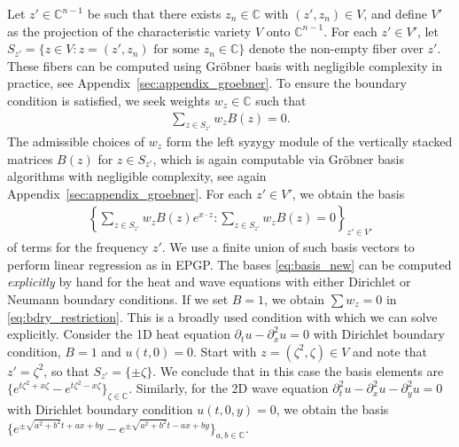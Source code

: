 \documentclass{article} %
\theoremstyle{plain}
\theoremstyle{definition}
\theoremstyle{remark}
\newenvironment{example}
  {\pushQED{\qed}\renewcommand{\qedsymbol}{$\triangle$}\examplex}
  {\popQED\endexamplex}
\newcommand{\CC}{\mathbb{C}}
\begin{document}
Let $z' \in \CC^{n-1}$ be such that there exists $z_n \in \CC$ with $(z', z_n) \in V$, and define $V'$ as the projection of the characteristic variety $V$ onto $\CC^{n-1}$. For each $z' \in V'$, let $S_{z'} = \{z \in V \colon z = (z', z_n) \text{ for some } z_n \in \CC\}$ denote the non-empty fiber over $z'$. These fibers can be computed using Gröbner basis with negligible complexity in practice, see Appendix~\ref{sec:appendix_groebner}. To ensure the boundary condition is satisfied, we seek weights $w_z \in \CC$ such that
\begin{align}\label{eq:bdry_restriction}
\sum\nolimits_{z \in S_{z'}} w_z B(z) = 0.
\end{align}
The admissible choices of $w_z$ form the left syzygy module of the vertically stacked matrices $B(z)$ for $z \in S_{z'}$, which is again computable via Gröbner basis algorithms with negligible complexity, see again Appendix~\ref{sec:appendix_groebner}.
For each $z'\in V'$, we obtain the basis
\begin{align}\label{eq:basis_new}
\left\{\sum\nolimits_{z\in S_{z'}}w_zB(z)e^{x\cdot z}\colon \sum\nolimits_{z\in S_{z'}}w_z B(z)=0\right\}_{z'\in V'}
\end{align}
of terms for the frequency $z'$.
We use a finite union of such basis vectors to perform linear regression as in EPGP.
The bases \eqref{eq:basis_new} can be computed \emph{explicitly} by hand for the heat and wave equations with either Dirichlet or Neumann boundary conditions. 
\begin{example}[Dirichlet boundary condition]
    If we set $B=1$, we  obtain $\sum w_z=0$ in \eqref{eq:bdry_restriction}. This is a broadly used condition with which we can solve explicitly.
\end{example}
\begin{example}\label{exa:1-D_heat}
    Consider the 1D heat equation $\partial_tu-\partial_x^2u=0$ with Dirichlet boundary condition, $B=1$ and $u(t,0)=0$. Start with $z=(\zeta^2,\zeta)\in V$ and note that $z'=\zeta^2$, so that $S_{z'}=\{\pm \zeta\}$. We conclude that in this case the basis elements are
    $
   \{  e^{t\zeta^2+x\zeta}- e^{t\zeta^2-x\zeta}\}_{\zeta\in\CC}.
    $
\end{example}
\begin{example}\label{exa:2-D_wave}
    Similarly, for the 2D wave equation $\partial_t^2u-\partial_x^2u-\partial_y^2u=0$ with Dirichlet boundary condition $u(t,0,y)=0$, we obtain the basis  $\{e^{\pm\sqrt{a^2+b^2}t+ax+by}-e^{\pm\sqrt{a^2+b^2}t-ax+by}\}_{a,b\in\CC}$.
\end{example}
\end{document}
